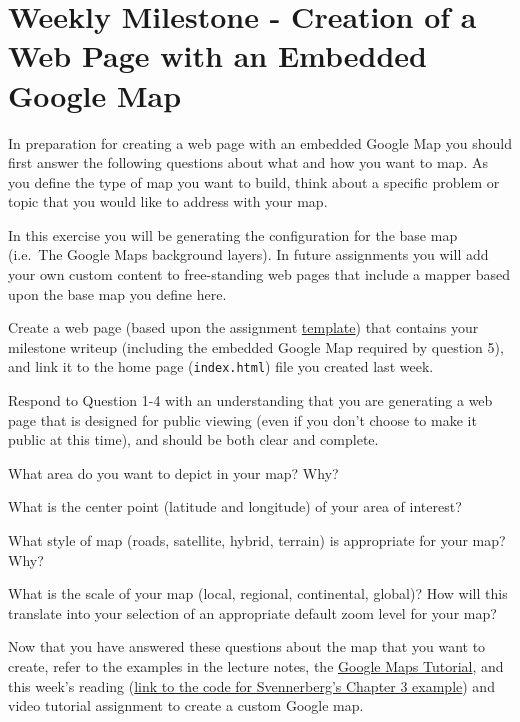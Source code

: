 \documentclass[]{book}
\providecommand{\tightlist}{%
  \setlength{\itemsep}{0pt}\setlength{\parskip}{0pt}}
\begin{document}
\section{Weekly Milestone - Creation of a Web Page with an Embedded
Google Map}\label{week03-milestone}

In preparation for creating a web page with an embedded Google Map you
should first answer the following questions about what and how you want
to map. As you define the type of map you want to build, think about a
specific problem or topic that you would like to address with your map.

In this exercise you will be generating the configuration for the base
map (i.e.~The Google Maps background layers). In future assignments you
will add your own custom content to free-standing web pages that include
a mapper based upon the base map you define here.

Create a web page (based upon the assignment
\href{https://github.com/UNM-GEOG-485-585/class-materials/blob/master/sample-files/assignmentTemplate.html}{template})
that contains your milestone writeup (including the embedded Google Map
required by question 5), and link it to the home page
(\texttt{index.html}) file you created last week.

Respond to Question 1-4 with an understanding that you are generating a
web page that is designed for public viewing (even if you don't choose
to make it public at this time), and should be both clear and complete.

\begin{description}
\tightlist
\item[Question 1]
What area do you want to depict in your map? Why?
\item[Question 2]
What is the center point (latitude and longitude) of your area of
interest?
\item[Question 3]
What style of map (roads, satellite, hybrid, terrain) is appropriate for
your map? Why?
\item[Question 4]
What is the scale of your map (local, regional, continental, global)?
How will this translate into your selection of an appropriate default
zoom level for your map?
\end{description}

Now that you have answered these questions about the map that you want
to create, refer to the examples in the lecture notes, the
\href{http://code.google.com/apis/maps/documentation/javascript/tutorial.html}{Google
Maps Tutorial}, and this week's reading
(\href{https://github.com/UNM-GEOG-485-585/class-materials/tree/master/sample-files/Svennerberg_Ch3_Example}{link
to the code for Svennerberg's Chapter 3 example}) and video tutorial
assignment to create a custom Google map.
\end{document}
